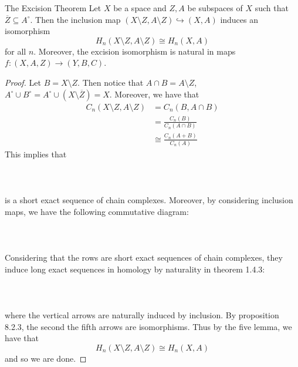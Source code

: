 \documentclass[a4paper]{article}
\begin{document}
\begin{thm}{The Excision Theorem}{} Let $X$ be a space and $Z,A$ be subspaces of $X$ such that $\overline{Z}\subseteq A^\circ$. Then the inclusion map $(X\setminus Z,A\setminus Z)\hookrightarrow (X,A)$ induces an isomorphism $$H_n(X\setminus Z,A\setminus Z)\cong H_n(X,A)$$ for all $n$. Moreover, the excision isomorphism is natural in maps $f:(X,A,Z)\to(Y,B,C)$. \tcbline
\begin{proof}
Let $B=X\setminus Z$. Then notice that $A\cap B=A\setminus Z$, $A^\circ\cup B^\circ=A^\circ\cup(X\setminus\overline{Z})=X$. Moreover, we have that 
\begin{align*}
C_n(X\setminus Z,A\setminus Z)&=C_n(B,A\cap B)\\
&=\frac{C_n(B)}{C_n(A\cap B)}\tag{By definition}\\
&\cong\frac{C_n(A+B)}{C_n(A)}\tag{Second Isomorphism Theorem}
\end{align*}
This implies that \\~\\
\\~\\
is a short exact sequence of chain complexes. Moreover, by considering inclusion maps, we have the following commutative diagram: \\~\\
\\~\\
Considering that the rows are short exact sequences of chain complexes, they induce long exact sequences in homology by naturality in theorem 1.4.3: \\~\\
\\~\\
where the vertical arrows are naturally induced by inclusion. By proposition 8.2.3, the second the fifth arrows are isomorphisms. Thus by the five lemma, we have that $$H_n(X\setminus Z,A\setminus Z)\cong H_n(X,A)$$ and so we are done. 
\end{proof}
\end{thm}
\end{document}
